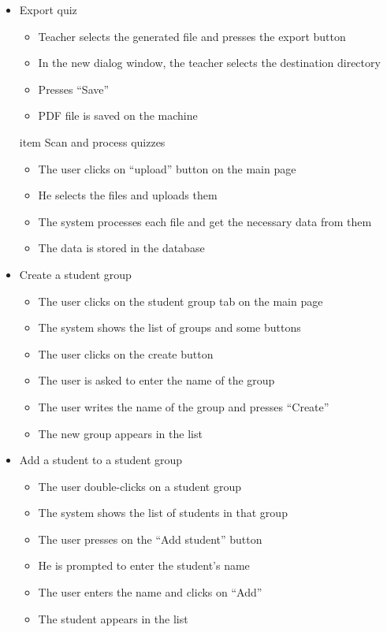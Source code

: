 \begin{itemize}
  \item Export quiz
  \begin{itemize}
    \item Teacher selects the generated file and presses the export button
    \item In the new dialog window, the teacher selects the destination directory
    \item Presses “Save”
    \item PDF file is saved on the machine
  \end{itemize}

  item Scan and process quizzes
  \begin{itemize}
    \item The user clicks on “upload” button on the main page
    \item He selects the files and uploads them
    \item The system processes each file and get the necessary data from them
    \item The data is stored in the database
  \end{itemize}

  \item Create a student group
  \begin{itemize}
    \item The user clicks on the student group tab on the main page
    \item The system shows the list of groups and some buttons
    \item The user clicks on the create button
    \item The user is asked to enter the name of the group
    \item The user writes the name of the group and presses “Create”
    \item The new group appears in the list
  \end{itemize}

  \item Add a student to a student group
  \begin{itemize}
    \item The user double-clicks on a student group
    \item The system shows the list of students in that group
    \item The user presses on the “Add student” button
    \item He is prompted to enter the student’s name
    \item The user enters the name and clicks on “Add”
    \item The student appears in the list
  \end{itemize}
\end{itemize}
